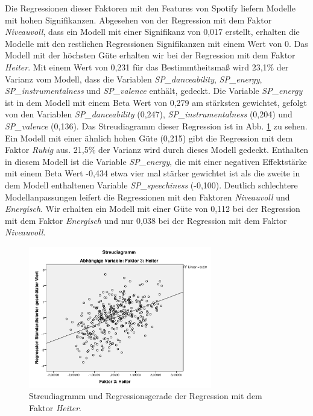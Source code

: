 Die Regressionen dieser Faktoren mit den Features von Spotify liefern Modelle mit hohen Signifikanzen. Abgesehen von der Regression mit dem Faktor \textit{Niveauvoll}, dass ein Modell mit einer Signifikanz von 0,017 erstellt, erhalten die Modelle mit den restlichen Regressionen Signifikanzen mit einem Wert von 0. 
Das Modell mit der höchsten Güte erhalten wir bei der Regression mit dem Faktor \textit{Heiter}.
Mit einem Wert von 0,231 für das Bestimmtheitsmaß wird 23,1\% der Varianz vom Modell, dass die Variablen \textit{SP\_danceability}, \textit{SP\_energy}, \textit{SP\_instrumentalness} und \textit{SP\_valence} enthält, gedeckt.
Die Variable \textit{SP\_energy} ist in dem Modell mit einem Beta Wert von 0,279 am stärksten gewichtet, gefolgt von den Variablen \textit{SP\_danceability} (0,247),  \textit{SP\_instrumentalness} (0,204) und \textit{SP\_valence} (0,136).
Das Streudiagramm dieser Regression ist in Abb. \ref{fig:Faktor3} zu sehen.    
Ein Modell mit einer ähnlich hohen Güte (0,215) gibt die Regression mit dem Faktor \textit{Ruhig} aus.
21,5\% der Varianz wird durch dieses Modell gedeckt.
Enthalten in diesem Modell ist die Variable \textit{SP\_energy}, die mit einer negativen Effektstärke mit einem Beta Wert -0,434 etwa vier mal stärker gewichtet ist als die zweite in dem Modell enthaltenen Variable \textit{SP\_speechiness} (-0,100).
Deutlich schlechtere Modellanpassungen leifert die Regressionen mit den Faktoren \textit{Niveauvoll} und \textit{Energisch}.
Wir erhalten ein Modell mit einer Güte von 0,112 bei der Regression mit dem Faktor \textit{Energisch} und nur 0,038 bei der Regression mit dem Faktor \textit{Niveauvoll}.


\begin{figure}[hbt]
    \begin{center}
        \includegraphics[width=8cm]{images/StreudiagrammFak3.pdf}
    \end{center}
    \caption{Streudiagramm und Regressionsgerade der Regression mit dem Faktor \textit{Heiter}.}
    \label{fig:Faktor3}
\end{figure}

